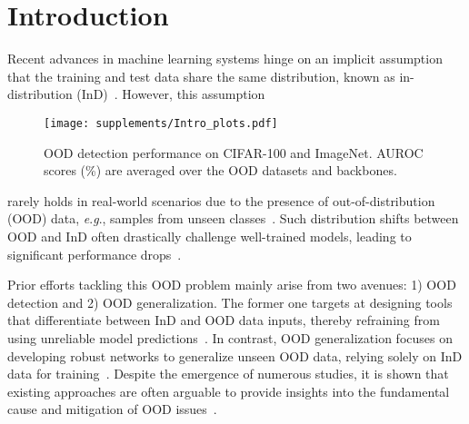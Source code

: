 \documentclass{article} \usepackage{iclr2024_conference,times}
\newcommand{\eg}{\textit{e}.\textit{g}.}
\begin{document}
\section{Introduction}
\vspace{-1mm}
\label{Sec:Intro}
Recent advances in machine learning systems hinge on an implicit assumption that the training and test data share the same distribution, known as in-distribution (InD)~\citep{tech:ViT,tech:conv,tech:ResNet,tech:deep_conv}.
However, this assumption 
\setlength\intextsep{2pt}
\begin{wrapfigure}[17]{r}{0cm}
	\centering
	\texttt{[image: supplements/Intro\_plots.pdf]}
	\caption{OOD detection performance on CIFAR-100 and ImageNet. AUROC scores (\%) are averaged over the OOD datasets and backbones.}
	\label{Fig:Intro-OOD-AUROC}
\end{wrapfigure}
rarely holds in real-world scenarios due to the presence of out-of-distribution (OOD) data, \eg, samples 
from unseen classes~\citep{Setup:DG}. 
Such distribution shifts between OOD 
and InD often drastically challenge well-trained models, leading to significant performance drops~\citep{OOD_Problem:ImgNet,OOD_Problem:ML-State}.


Prior efforts tackling this OOD problem mainly arise from two avenues: 1) OOD detection and 2) OOD generalization. The former one targets at designing tools that differentiate between InD and OOD data inputs, thereby refraining from using unreliable model predictions~\citep{OOD_Detect:MSP,OOD_Detect:ODIN,OOD_Detect:Energy,OOD_Detect:GradNorm}. 
In contrast, OOD generalization focuses on developing robust networks to generalize unseen OOD data, relying solely on InD data for training~\citep{Setup:DG,Baseline:CORAL,Baseline:GroupDRO,CL&DG:SelfReg,Baseline:Fish}. 
Despite the emergence of numerous studies, it is shown that existing approaches are often arguable to provide insights into the fundamental cause and mitigation of OOD issues~\citep{OOD_Detect:ReAct,Setup:DomainBed}.
\end{document}
